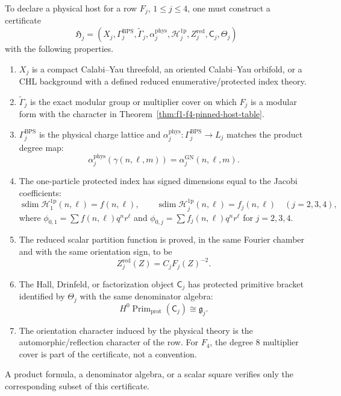 \begin{definition}
\label{def:f1-f4-row-map-certificate}
To declare a physical host for a row \(F_j\), \(1\le j\le4\), one must
construct a certificate
\[
\mathfrak H_j=
\left(
X_j,\Gamma_j^{\mathrm{BPS}},\widetilde\Gamma_j,
\alpha_j^{\mathrm{phys}},\mathcal H^{1\mathrm p}_{j},
Z_j^{\mathrm{red}},\mathsf C_j,\Theta_j
\right)
\]
with the following properties.
\begin{enumerate}
\item \(X_j\) is a compact Calabi--Yau threefold, an oriented
Calabi--Yau orbifold, or a CHL background with a defined reduced
enumerative/protected index theory.
\item \(\widetilde\Gamma_j\) is the exact modular group or multiplier
cover on which \(F_j\) is a modular form with the character in
Theorem~\ref{thm:f1-f4-pinned-host-table}.
\item \(\Gamma_j^{\mathrm{BPS}}\) is the physical charge lattice and
\(\alpha_j^{\mathrm{phys}}:\Gamma_j^{\mathrm{BPS}}\to L_j\) matches
the product degree map:
\[
\alpha_j^{\mathrm{phys}}(\gamma(n,\ell,m))
=\alpha_j^{\mathrm{GN}}(n,\ell,m).
\]
\item The one-particle protected index has signed dimensions equal to
the Jacobi coefficients:
\[
\operatorname{sdim}\mathcal H^{1\mathrm p}_{1}(n,\ell)=f(n,\ell),
\qquad
\operatorname{sdim}\mathcal H^{1\mathrm p}_{j}(n,\ell)=f_j(n,\ell)
\quad(j=2,3,4),
\]
where \(\phi_{0,1}=\sum f(n,\ell)q^nr^\ell\) and
\(\phi_{0,j}=\sum f_j(n,\ell)q^nr^\ell\) for \(j=2,3,4\).
\item The reduced scalar partition function is proved, in the same
Fourier chamber and with the same orientation sign, to be
\[
Z_j^{\mathrm{red}}(Z)=C_jF_j(Z)^{-2}.
\]
\item The Hall, Drinfeld, or factorization object \(\mathsf C_j\)
has protected primitive bracket identified by \(\Theta_j\) with the
same denominator algebra:
\[
H^0\operatorname{Prim}_{\mathrm{prot}}(\mathsf C_j)
\cong\mathfrak g_j.
\]
\item The orientation character induced by the physical theory is the
automorphic/reflection character of the row.  For \(F_4\), the degree
\(8\) multiplier cover is part of the certificate, not a convention.
\end{enumerate}
A product formula, a denominator algebra, or a scalar square verifies
only the corresponding subset of this certificate.
\end{definition}

